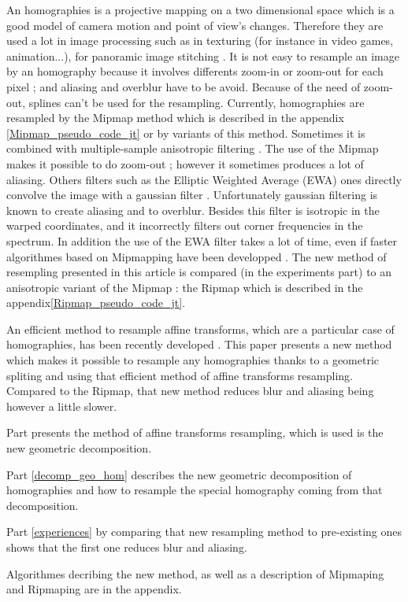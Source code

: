 
An homographies is a projective mapping on a two dimensional space which is a good model of camera motion and point of view's changes. Therefore they are used a lot in image processing such as in texturing \cite{heckbert1983texture} (for instance in video games, animation...), for panoramic image stitching \cite{brown2007automatic}. It is not easy to resample an image by an homography because it involves differents zoom-in or zoom-out for each pixel ; and aliasing and overblur have to be avoid. Because of the need of zoom-out, splines can't be used for the resampling. Currently, homographies are resampled by the Mipmap method \cite{williams1983pyramidal} which is described in the appendix \ref{Mipmap_pseudo_code_jt} or by variants of this method. Sometimes it is combined with multiple-sample anisotropic filtering  \cite{barkans1997high}. The use of the Mipmap makes it possible to do zoom-out ; however it sometimes produces a lot of aliasing. Others filters such as the Elliptic Weighted Average (EWA) ones directly convolve the image with a gaussian filter \cite{greene1986creating}. Unfortunately gaussian filtering is known to create aliasing and to overblur. Besides this filter is isotropic in the warped coordinates, and it incorrectly filters out corner frequencies in the spectrum. In addition the use of the EWA filter takes a lot of time, even if faster algorithmes based on Mipmapping have been developped \cite{mccormack1999feline,huttner1999fast}. The new method of resempling presented in this article is compared (in the experiments part) to an anisotropic variant of the Mipmap : the Ripmap \cite{akenine2008real} which is described in the appendix\ref{Ripmap_pseudo_code_jt}.

	An efficient method to resample affine transforms, which are a particular case of homographies, has been recently developed \cite{szeliski2010high}. This paper presents a new method which makes it possible to resample any homographies thanks to a geometric spliting and using that efficient method of affine transforms resampling. Compared to the Ripmap, that new method reduces blur and aliasing being however a little slower. 
	
	Part \label{szeliski_section} presents the method of affine transforms resampling, which is used is the new geometric decomposition.
	
	Part \ref{decomp_geo_hom} describes the new geometric decomposition of homographies and how to resample the special homography coming from that decomposition.
	
	Part \ref{experiences} by comparing that new resampling method to pre-existing ones shows that the first one reduces blur and aliasing.
	
	Algorithmes decribing the new method, as well as a description of Mipmaping and Ripmaping are in the appendix.
	
